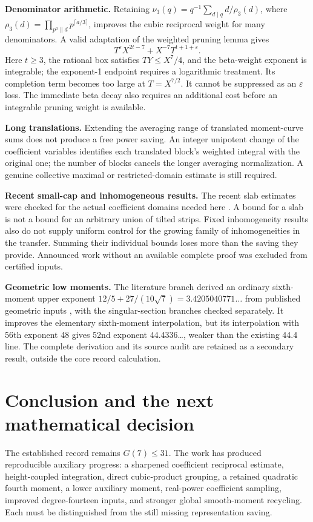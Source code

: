 \documentclass[11pt,letterpaper]{article}
\theoremstyle{remark}
\newcommand{\eps}{\varepsilon}
\newcommand{\BoundGSeven}{31}
\begin{document}
\textbf{Denominator arithmetic.}
Retaining $\nu_3(q)=q^{-1}\sum_{d\mid q}d/\rho_3(d)$, where
$\rho_3(d)=\prod_{p^a\parallel d}p^{\lceil a/3\rceil}$, improves the cubic reciprocal
weight for many denominators. A valid adaptation of the weighted pruning lemma gives
\[
 T^\eps X^{2t-7}+X^{-7}T^{t+1+\eps}.
\]
Here $t\ge3$, the rational box satisfies $TY\le X^7/4$, and the beta-weight
exponent is integrable; the exponent-1 endpoint requires a logarithmic treatment.
Its completion term becomes too large at $T=X^{7/2}$. It cannot be suppressed
as an $\eps$ loss. The immediate beta decay also requires an additional cost before
an integrable pruning weight is available.

\textbf{Long translations.}
Extending the averaging range of translated moment-curve sums does not produce
a free power saving. An integer unipotent change of the coefficient variables
identifies each translated block's weighted integral with the original one;
the number of blocks cancels the longer averaging normalization. A genuine
collective maximal or restricted-domain estimate is still required.

\textbf{Recent small-cap and inhomogeneous results.}
The recent slab estimates were checked for the actual coefficient domains needed
here \cite{JO26,OY25}.
A bound for a slab is not a bound for an arbitrary union of tilted strips. Fixed
inhomogeneity results also do not supply uniform control for the growing family of
inhomogeneities in the transfer. Summing their individual bounds loses more than
the saving they provide. Announced work without an available complete proof was
excluded from certified inputs.

\textbf{Geometric low moments.}
The literature branch derived an ordinary sixth-moment upper exponent
$12/5+27/(10\sqrt7)=3.4205040771\ldots$ from published geometric inputs
\cite{Sal05,Sal23,Ver25}, with
the singular-section branches checked separately. It improves the elementary
sixth-moment interpolation, but its interpolation with 56th exponent 48 gives
52nd exponent 44.4336\ldots, weaker than the existing 44.4 line. The complete
derivation and its source audit are retained as a secondary result, outside the
core record calculation.

\section{Conclusion and the next mathematical decision}

The established record remains $G(7)\le\BoundGSeven$. The work has produced
reproducible auxiliary progress: a sharpened coefficient reciprocal estimate,
height-coupled integration, direct cubic-product grouping, a retained quadratic
fourth moment, a lower auxiliary moment, real-power coefficient sampling,
improved degree-fourteen inputs, and stronger global smooth-moment recycling.
Each must be distinguished from the still missing representation saving.
\end{document}

